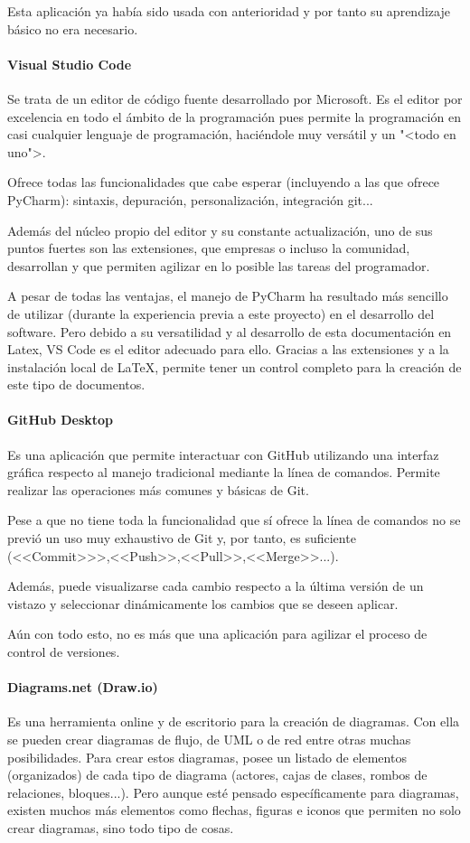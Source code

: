 Esta aplicación ya había sido usada con anterioridad y por tanto su aprendizaje
básico no era necesario.

\paragraph{Visual Studio Code}
Se trata de un editor de código fuente desarrollado por Microsoft. Es el editor
por excelencia en todo el ámbito de la programación pues permite la programación
en casi cualquier lenguaje de programación, haciéndole muy versátil y un "<todo
en uno">.

Ofrece todas las funcionalidades que cabe esperar (incluyendo a las que ofrece
PyCharm): sintaxis, depuración, personalización, integración git...

Además del núcleo propio del editor y su constante actualización, uno de sus
puntos fuertes son las extensiones, que empresas o incluso la comunidad,
desarrollan y que permiten agilizar en lo posible las tareas del programador.

A pesar de todas las ventajas, el manejo de PyCharm ha resultado más sencillo de
utilizar (durante la experiencia previa a este proyecto) en el desarrollo del
software. Pero debido a su versatilidad y al desarrollo de esta documentación en
Latex, VS Code es el editor adecuado para ello. Gracias a las extensiones y a la
instalación local de \LaTeX, permite tener un control completo para la creación
de este tipo de documentos.

\paragraph{GitHub Desktop}
Es una aplicación que permite interactuar con GitHub utilizando una interfaz
gráfica respecto al manejo tradicional mediante la línea de comandos. Permite
realizar las operaciones más comunes y básicas de Git.

Pese a que no tiene toda la funcionalidad que sí ofrece la línea de comandos no
se previó un uso muy exhaustivo de Git y, por tanto, es suficiente
(<<Commit>>>,<<Push>>,<<Pull>>,<<Merge>>...).

Además, puede visualizarse cada cambio respecto a la última versión de un
vistazo y seleccionar dinámicamente los cambios que se deseen aplicar.

Aún con todo esto, no es más que una aplicación para agilizar el proceso de
control de versiones.

\paragraph{Diagrams.net (Draw.io)}
Es una herramienta online y de escritorio para la creación de diagramas. Con
ella se pueden crear diagramas de flujo, de UML o de red entre otras muchas
posibilidades. Para crear estos diagramas, posee un listado de elementos
(organizados) de cada tipo de diagrama (actores, cajas de clases, rombos de
relaciones, bloques...). Pero aunque esté pensado específicamente para
diagramas, existen muchos más elementos como flechas, figuras e iconos que
permiten no solo crear diagramas, sino todo tipo de cosas.

